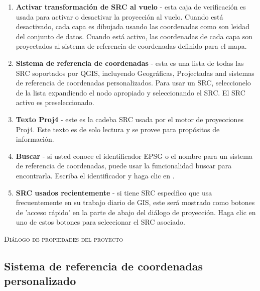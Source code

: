 \begin{enumerate}
\item \textbf{Activar transformaci\'on de SRC al vuelo} -
esta caja de verificaci\'on es usada para activar o desactivar la proyecci\'on al vuelo. Cuando est\'a desactivado, cada
capa es dibujada usando las coordenadas como son leidad del conjunto de datos. Cuando est\'a activo,
las coordenadas de cada capa son proyectados al sistema de referencia de coordenadas
definido para el mapa.
\item \textbf{Sistema de referencia de coordenadas} - esta es una lista de todas las SRC
soportados por QGIS, incluyendo Geogr\'aficas, Projectadas and sistemas de referencia
de coordenadas personalizados. Para usar un SRC, seleccionelo de la lista expandiendo
el nodo apropiado y seleccionando el SRC. El SRC activo es preseleccionado.
\item \textbf{Texto Proj4} - este es la cadeba SRC usada por el motor de proyecciones Proj4.
Este texto es de solo lectura y se provee para prop\'ositos de
informaci\'on.
\item \textbf{Buscar} - si usted conoce el identificador EPSG o el nombre 
para un sistema de referencia de coordenadas, puede usar la funcionalidad buscar para encontrarla.
Escriba el identificador y haga clic en .
\item \textbf{SRC usados recientemente} - si tiene SRC espec\'{\i}fico que usa frecuentemente 
en su trabajo diario de GIS, este ser\'a mostrado como botones de 'acceso r\'apido' 
en la parte de abajo del di\'alogo de proyecci\'on. Haga clic en uno de estos botones para seleccionar
el SRC asociado.
\end{enumerate}

\begin{Tip}
\caption{\textsc{Di\'alogo de propiedades del proyecto}}
\end{Tip}

\subsection{Sistema de referencia de coordenadas personalizado}\label{sec:customprojections}

